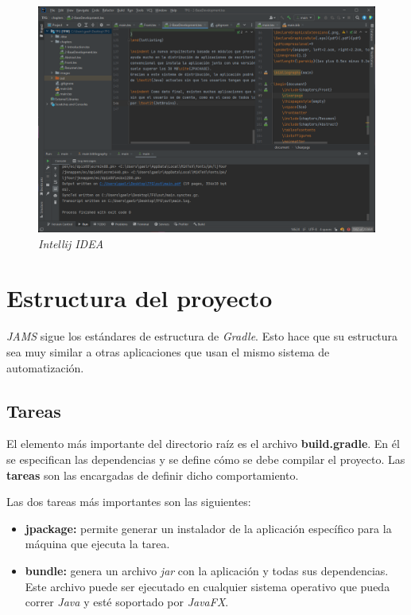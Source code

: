 \begin{figure}[h]
    \centering
    \includegraphics[width=\textwidth]{images/base/intellij-idea}
    \caption{\textit{Intellij IDEA}}
    \label{fig:java-intellij-idea}
\end{figure}


\section{Estructura del proyecto}\label{sec:estructura-del-proyecto}

\textit{JAMS} sigue los estándares de estructura de \textit{Gradle}\cite{GRADLE_ORGANIZING}.
Esto hace que su estructura sea muy similar a otras aplicaciones que usan el mismo
sistema de automatización.

\subsection{Tareas}\label{subsec:tareas}

El elemento más importante del directorio raíz es el archivo \textbf{build.gradle}.
En él se especifican las dependencias y se define cómo se debe compilar el proyecto.
Las \textbf{tareas} son las encargadas de definir dicho comportamiento.

Las dos tareas más importantes son las siguientes:
\begin{itemize}
    \item \textbf{jpackage:} permite generar un instalador de la aplicación específico
    para la máquina que ejecuta la tarea.
    \item \textbf{bundle:} genera un archivo \textit{jar} con la aplicación y todas
    sus dependencias.
    Este archivo puede ser ejecutado en cualquier sistema operativo que pueda correr
    \textit{Java} y esté soportado por \textit{JavaFX}.
\end{itemize}

